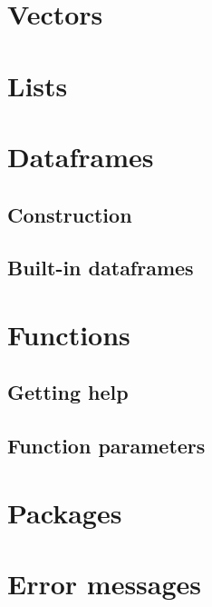 \documentclass[
]{book}
\begin{document}
\hypertarget{vectors}{%
\section{Vectors}\label{vectors}}

\hypertarget{lists}{%
\section{Lists}\label{lists}}

\hypertarget{dataframes}{%
\section{Dataframes}\label{dataframes}}

\hypertarget{construction}{%
\subsection{Construction}\label{construction}}

\hypertarget{built-in-dataframes}{%
\subsection{Built-in dataframes}\label{built-in-dataframes}}

\hypertarget{functions}{%
\section{Functions}\label{functions}}

\hypertarget{getting-help}{%
\subsection{Getting help}\label{getting-help}}

\hypertarget{function-parameters}{%
\subsection{Function parameters}\label{function-parameters}}

\hypertarget{packages}{%
\section{Packages}\label{packages}}

\hypertarget{error-messages}{%
\section{Error messages}\label{error-messages}}
\end{document}
